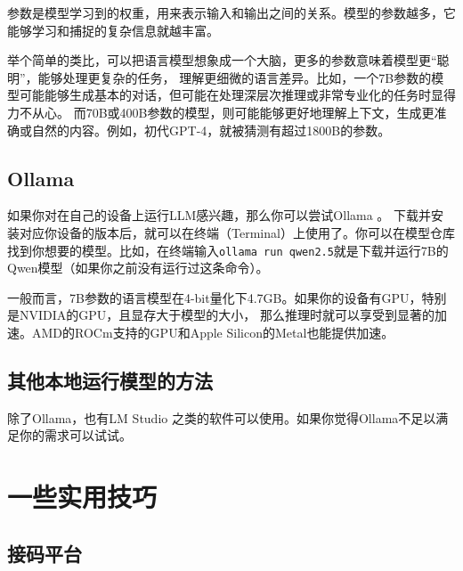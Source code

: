 参数是模型学习到的权重，用来表示输入和输出之间的关系。模型的参数越多，它能够学习和捕捉的复杂信息就越丰富。

举个简单的类比，可以把语言模型想象成一个大脑，更多的参数意味着模型更“聪明”，能够处理更复杂的任务，
理解更细微的语言差异。比如，一个7B参数的模型可能能够生成基本的对话，但可能在处理深层次推理或非常专业化的任务时显得力不从心。
而70B或400B参数的模型，则可能能够更好地理解上下文，生成更准确或自然的内容。例如，初代GPT-4，就被猜测有超过1800B的参数。

\subsection{\textsf{Ollama}}

如果你对在自己的设备上运行LLM感兴趣，那么你可以尝试\textsf{Ollama} \href{https://ollama.com}{\color{black}\faLink}。
下载并安装对应你设备的版本后，就可以在终端（Terminal）上使用了。你可以在模型仓库 \href{https://ollama.com/library}{\color{black}\faLink} 
找到你想要的模型。比如，在终端输入\texttt{ollama run qwen2.5}就是下载并运行7B的\textsf{Qwen}模型（如果你之前没有运行过这条命令）。

一般而言，7B参数的语言模型在4-bit量化下4.7GB。如果你的设备有GPU，特别是\textsf{NVIDIA}的GPU，且显存大于模型的大小，
那么推理时就可以享受到显著的加速。\textsf{AMD}的\textsf{ROCm}支持的GPU和\textsf{Apple Silicon}的\textsf{Metal}也能提供加速。
\subsection{其他本地运行模型的方法}

除了\textsf{Ollama}，也有\textsf{LM Studio} \href{https://lmstudio.ai}{\color{black}\faLink} 之类的软件可以使用。如果你觉得\textsf{Ollama}不足以满足你的需求可以试试。

\section{一些实用技巧}
\hypertarget{sms-code}{\subsection{接码平台}}

